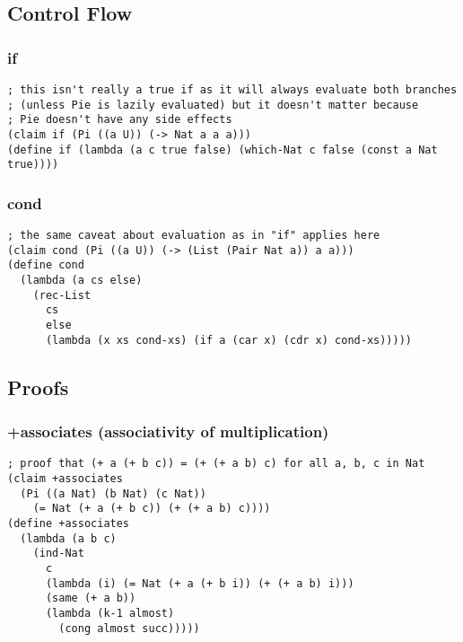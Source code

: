 \subsection{Control Flow}

\subsubsection{if} \label{code:if}
\begin{verbatim}
; this isn't really a true if as it will always evaluate both branches
; (unless Pie is lazily evaluated) but it doesn't matter because
; Pie doesn't have any side effects 
(claim if (Pi ((a U)) (-> Nat a a a)))
(define if (lambda (a c true false) (which-Nat c false (const a Nat true))))
\end{verbatim}

\subsubsection{cond} \label{code:cond}
\begin{verbatim}
; the same caveat about evaluation as in "if" applies here
(claim cond (Pi ((a U)) (-> (List (Pair Nat a)) a a)))
(define cond
  (lambda (a cs else)
    (rec-List
      cs
      else
      (lambda (x xs cond-xs) (if a (car x) (cdr x) cond-xs)))))
\end{verbatim}


\subsection{Proofs}

\subsubsection{+associates (associativity of multiplication)} \label{code:+associates}
\begin{verbatim}
; proof that (+ a (+ b c)) = (+ (+ a b) c) for all a, b, c in Nat
(claim +associates
  (Pi ((a Nat) (b Nat) (c Nat))
    (= Nat (+ a (+ b c)) (+ (+ a b) c))))
(define +associates
  (lambda (a b c)
    (ind-Nat
      c
      (lambda (i) (= Nat (+ a (+ b i)) (+ (+ a b) i)))
      (same (+ a b))
      (lambda (k-1 almost)
        (cong almost succ)))))
\end{verbatim}

